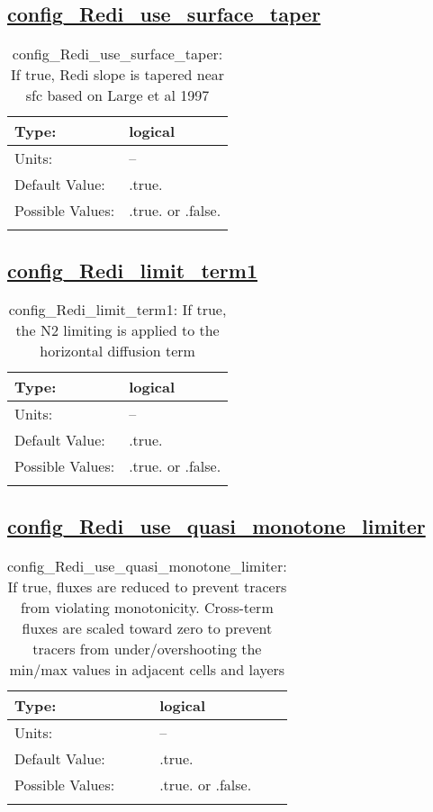 \subsection[config\_Redi\_use\_surface\_taper]{\hyperref[sec:nm_tab_Redi_isopycnal_mixing]{config\_Redi\_use\_surface\_taper}}
\label{subsec:nm_sec_config_Redi_use_surface_taper}
\begin{center}
\begin{longtable}{| p{2.0in} || p{4.0in} |}
    \hline
    Type: & logical \\
    \hline
    Units: & -- \\
    \hline
    Default Value: & .true. \\
    \hline
    Possible Values: & .true. or .false. \\
    \hline
    \caption{config\_Redi\_use\_surface\_taper: If true, Redi slope is tapered near sfc based on Large et al 1997}
\end{longtable}
\end{center}
\subsection[config\_Redi\_limit\_term1]{\hyperref[sec:nm_tab_Redi_isopycnal_mixing]{config\_Redi\_limit\_term1}}
\label{subsec:nm_sec_config_Redi_limit_term1}
\begin{center}
\begin{longtable}{| p{2.0in} || p{4.0in} |}
    \hline
    Type: & logical \\
    \hline
    Units: & -- \\
    \hline
    Default Value: & .true. \\
    \hline
    Possible Values: & .true. or .false. \\
    \hline
    \caption{config\_Redi\_limit\_term1: If true, the N2 limiting is applied to the horizontal diffusion term}
\end{longtable}
\end{center}
\subsection[config\_Redi\_use\_quasi\_monotone\_limiter]{\hyperref[sec:nm_tab_Redi_isopycnal_mixing]{config\_Redi\_use\_quasi\_monotone\_limiter}}
\label{subsec:nm_sec_config_Redi_use_quasi_monotone_limiter}
\begin{center}
\begin{longtable}{| p{2.0in} || p{4.0in} |}
    \hline
    Type: & logical \\
    \hline
    Units: & -- \\
    \hline
    Default Value: & .true. \\
    \hline
    Possible Values: & .true. or .false. \\
    \hline
    \caption{config\_Redi\_use\_quasi\_monotone\_limiter: If true, fluxes are reduced to prevent tracers from violating monotonicity. Cross-term fluxes are scaled toward zero to prevent tracers from under/overshooting the min/max values in adjacent cells and layers}
\end{longtable}
\end{center}
